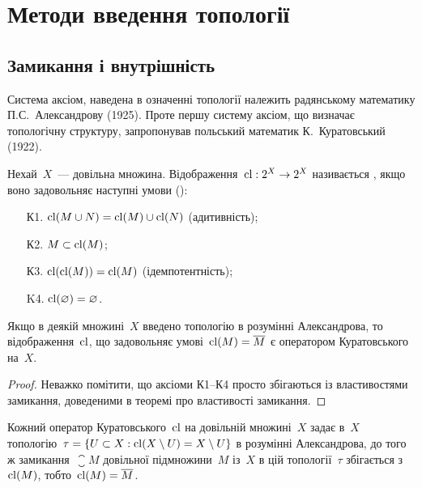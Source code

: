 \chapter{Методи введення топології}

\section{Замикання і внутрішність}

Система аксіом, наведена в означенні топології належить радянському математику П.С.~Александрову (1925). Проте першу систему аксіом, що визначає топологічну структуру, запропонував польський математик К.~Куратовський (1922).

\begin{definition}
    Нехай~$X$~--- довільна множина. Відображення~$\operatorname{cl}: 2^X \to 2^X$ називається , якщо воно задовольняє наступні умови ():
    \begin{enumerate}
        \item[К1.] $\operatorname{cl}(M \cup N) = \operatorname{cl}(M) \cup \operatorname{cl}(N)$ (адитивність);
        \item[К2.] $M \subset \operatorname{cl}(M)$;
        \item[К3.] $\operatorname{cl}(\operatorname{cl}(M)) = \operatorname{cl}(M)$ (ідемпотентність);
        \item[K4.] $\operatorname{cl}(\varnothing) = \varnothing$.
    \end{enumerate}
\end{definition}

\begin{theorem}
    Якщо в деякій множині~$X$ введено топологію в розумінні Александрова, то відображення~$\operatorname{cl}$, що задовольняє умові~$\operatorname{cl} (M) = \overline{M}$ є оператором Куратовського на~$X$.
\end{theorem}

\begin{proof}
    Неважко помітити, що аксіоми К1--К4 просто збігаються із властивостями замикання, доведеними в теоремі про властивості замикання.
\end{proof}

\begin{theorem}
    Кожний оператор Куратовського~$\operatorname{cl}$ на довільній множині~$X$ задає в~$X$ топологію~$\tau = \{ U \subset X: \operatorname{cl}(X \setminus U) = X \setminus U\}$ в розумінні Александрова, до того ж замикання~$\closure{M}$ довільної підмножини~$M$ із~$X$ в цій топології~$\tau$ збігається з~$\operatorname{cl}(M)$, тобто~$\operatorname{cl} (M) = \overline{M}$.
\end{theorem}


